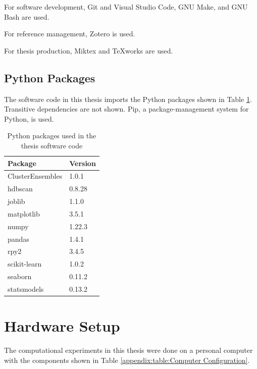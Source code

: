 \begin{theappendices}
For software development, Git and Visual Studio Code, GNU Make, and GNU Bash are used.

For reference management, Zotero is used.

For thesis production, Miktex and TeXworks are used.

\FloatBarrier
\subsection{Python Packages}

The software code in this thesis imports the Python packages shown in Table \ref{appendix:table:Python Packages}. Transitive dependencies are not shown. Pip, a package-management system for Python, is used.

\begin{table}[htbp]
\centering
\begin{tabular}{ll}
\toprule
         Package & Version \\
\midrule
ClusterEnsembles &   1.0.1 \\
         hdbscan &  0.8.28 \\
          joblib &   1.1.0 \\
      matplotlib &   3.5.1 \\
           numpy &  1.22.3 \\
          pandas &   1.4.1 \\
            rpy2 &   3.4.5 \\
    scikit-learn &   1.0.2 \\
         seaborn &  0.11.2 \\
     statsmodels &  0.13.2 \\
\bottomrule
\end{tabular}
\caption{Python packages used in the thesis software code}
\label{appendix:table:Python Packages}
\end{table}

\section{Hardware Setup}

The computational experiments in this thesis were done on a personal computer with the components shown in Table \ref{appendix:table:Computer Configuration}.


\end{theappendices}
